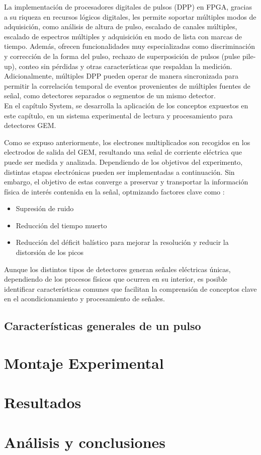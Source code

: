 \documentclass[]{book}
\begin{document}
\noindent La implementación de procesadores digitales de pulsos (DPP) en FPGA, gracias a su riqueza en recursos lógicos digitales, les permite soportar múltiples modos de adquisición, como análisis de altura de pulso, escalado de canales múltiples, escalado de espectros múltiples y adquisición en modo de lista con marcas de tiempo. Además, ofrecen funcionalidades muy especializadas como discriminación y corrección de la forma del pulso, rechazo de superposición de pulsos (pulse pile-up), conteo sin pérdidas y otras características que respaldan la medición. Adicionalmente, múltiples DPP pueden operar de manera sincronizada para permitir la correlación temporal de eventos provenientes de múltiples fuentes de señal, como detectores separados o segmentos de un mismo detector. \\

\noindent En el capítulo System, se desarrolla la aplicación de los conceptos expuestos en este capítulo, en un sistema experimental de lectura y procesamiento para detectores GEM.

\noindent Como se expuso anteriormente, los electrones multiplicados son recogidos en los electrodos de salida del GEM, resultando una señal de corriente eléctrica que puede ser medida y analizada. Dependiendo de los objetivos del experimento, distintas etapas electrónicas pueden ser implementadas a continuación. Sin embargo, el objetivo de estas converge a preservar y transportar la información física de interés contenida en la señal, optmizando factores clave como \cite{knoll2010radiation}:

\begin{itemize}
    \item Supresión de ruido 
    \item Reducción del tiempo muerto
    \item Reducción del déficit balístico para mejorar la resolución y reducir la distorsión de los picos
\end{itemize}

\noindent Aunque los distintos tipos de detectores generan señales eléctricas únicas, dependiendo de los procesos físicos que ocurren en su interior, es posible identificar características comunes que facilitan la comprensión de conceptos clave en el acondicionamiento y procesamiento de señales.

\subsection{Características generales de un pulso}



\section{Montaje Experimental}
\section{Resultados}
\section{Análisis y conclusiones}





\end{document}
